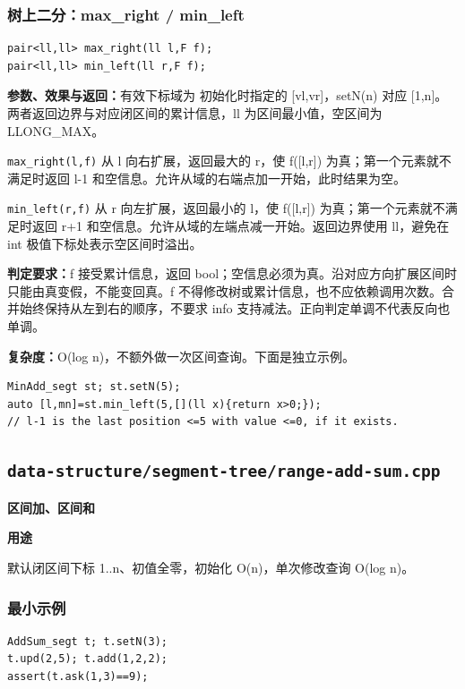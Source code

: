 \documentclass[UTF8,a4paper,10pt]{ctexart}
\newcommand{\TemplUsage}[1]{\textbf{用途}\par #1\par}
\begin{document}
\noindent\begin{minipage}{\textwidth}
\subsubsection*{树上二分：max\_right / min\_left}
\begin{lstlisting}
pair<ll,ll> max_right(ll l,F f);
pair<ll,ll> min_left(ll r,F f);
\end{lstlisting}
\textbf{参数、效果与返回：}有效下标域为 初始化时指定的 [vl,vr]，setN(n) 对应 [1,n]。两者返回边界与对应闭区间的累计信息，ll 为区间最小值，空区间为 LLONG\_MAX。

\texttt{max\_right(l,f)} 从 l 向右扩展，返回最大的 r，使 f([l,r]) 为真；第一个元素就不满足时返回 l-1 和空信息。允许从域的右端点加一开始，此时结果为空。

\texttt{min\_left(r,f)} 从 r 向左扩展，返回最小的 l，使 f([l,r]) 为真；第一个元素就不满足时返回 r+1 和空信息。允许从域的左端点减一开始。返回边界使用 ll，避免在 int 极值下标处表示空区间时溢出。

\textbf{判定要求：}f 接受累计信息，返回 bool；空信息必须为真。沿对应方向扩展区间时只能由真变假，不能变回真。f 不得修改树或累计信息，也不应依赖调用次数。合并始终保持从左到右的顺序，不要求 info 支持减法。正向判定单调不代表反向也单调。

\textbf{复杂度：}O(log n)，不额外做一次区间查询。下面是独立示例。
\begin{lstlisting}
MinAdd_segt st; st.setN(5);
auto [l,mn]=st.min_left(5,[](ll x){return x>0;});
// l-1 is the last position <=5 with value <=0, if it exists.
\end{lstlisting}

\end{minipage}\par
\clearpage
\subsection{\texttt{data-structure/segment-tree/range-add-sum.cpp}}
\textbf{区间加、区间和}\par
\TemplUsage{默认闭区间下标 1..n、初值全零，初始化 O(n)，单次修改查询 O(log n)。}
\subsubsection*{最小示例}
\begin{lstlisting}
AddSum_segt t; t.setN(3);
t.upd(2,5); t.add(1,2,2);
assert(t.ask(1,3)==9);
\end{lstlisting}
\end{document}
